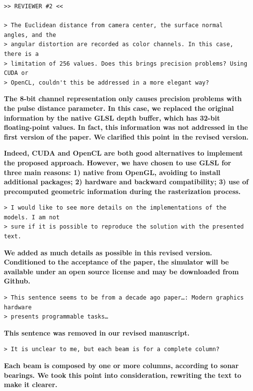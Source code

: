 \documentclass{article}
\begin{document}
\begin{verbatim}
>> REVIEWER #2 <<

> The Euclidean distance from camera center, the surface normal angles, and the
> angular distortion are recorded as color channels. In this case, there is a
> limitation of 256 values. Does this brings precision problems? Using CUDA or
> OpenCL, couldn't this be addressed in a more elegant way?
\end{verbatim}

\textbf{The 8-bit channel representation only causes precision problems with the pulse distance parameter. In this case, we replaced the original information by the native GLSL depth buffer, which has 32-bit floating-point values. In fact, this information was not addressed in the first version of the paper. We clarified this point in the revised version.}

\textbf{Indeed, CUDA and OpenCL are both good alternatives to implement
the proposed approach. However, we have chosen to use GLSL for three main reasons:
1) native from OpenGL, avoiding to install additional packages;
2) hardware and backward compatibility;
3) use of precomputed geometric information during the rasterization process.}

\begin{verbatim}
> I would like to see more details on the implementations of the models. I am not
> sure if it is possible to reproduce the solution with the presented text.
\end{verbatim}

\textbf{We added as much details as possible in this revised version. Conditioned to the acceptance of the paper, the simulator will be available under an open source license and may be downloaded from Github.}

\begin{verbatim}
> This sentence seems to be from a decade ago paper…: Modern graphics hardware
> presents programmable tasks…
\end{verbatim}

\textbf{This sentence was removed in our revised manuscript.}

\begin{verbatim}
> It is unclear to me, but each beam is for a complete column?
\end{verbatim}

\textbf{Each beam is composed by one or more columns, according to sonar
bearings. We took this point into consideration, rewriting the text to make
it clearer.}
\end{document}
